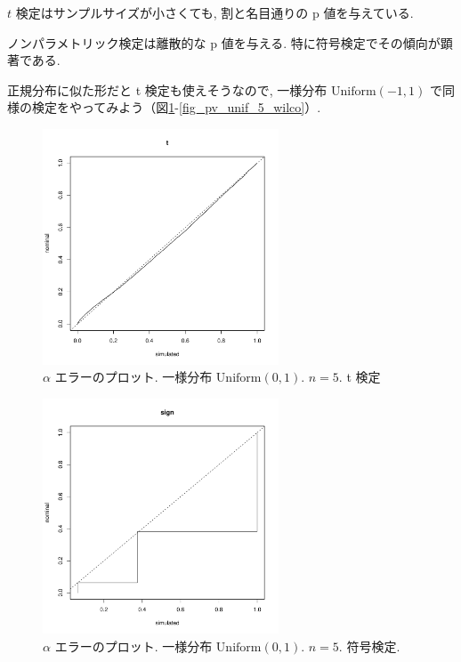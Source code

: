 \documentclass[12pt]{jsarticle}
\begin{document}
$t$ 検定はサンプルサイズが小さくても, 割と名目通りの p 値を与えている. 

ノンパラメトリック検定は離散的な p 値を与える. 特に符号検定でその傾向が顕著である.

正規分布に似た形だと t 検定も使えそうなので, 一様分布 $\mathrm{Uniform}(-1,1)$ で同様の検定をやってみよう（図\ref{fig_pv_unif_5_t}-\ref{fig_pv_unif_5_wilco}）.

\begin{figure}[htbp]
  \begin{center}
\includegraphics[width=70mm]{img/pv_unif_5_t.pdf}
  \end{center}
     \caption{$\alpha$ エラーのプロット. 一様分布 $\mathrm{Uniform}(0,1)$. $n=5$. t 検定}
  \label{fig_pv_unif_5_t}
 \end{figure}
 
 \begin{figure}[htbp]
 \begin{center}
  \includegraphics[width=70mm]{img/pv_unif_5_sign.pdf}
 \end{center}
      \caption{$\alpha$ エラーのプロット. 一様分布 $\mathrm{Uniform}(0,1)$. $n=5$. 符号検定.}
     \end{figure}  
\end{document}
